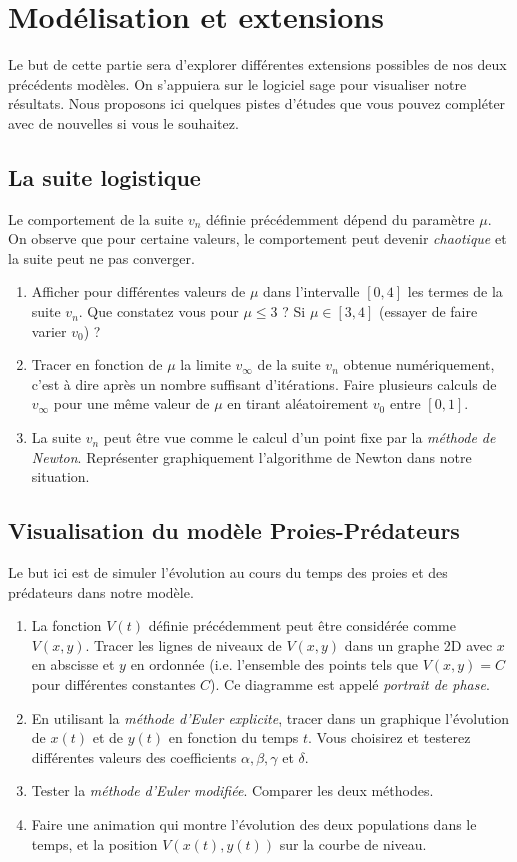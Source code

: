 \documentclass{../ficheTDTP}
\begin{document}
\section{Modélisation et extensions}

	Le but de cette partie sera d'explorer différentes extensions possibles de nos deux précédents modèles. On s'appuiera sur le logiciel sage pour visualiser notre résultats. Nous proposons ici quelques pistes d'études que vous pouvez compléter avec de nouvelles si vous le souhaitez.
	
\subsection{La suite logistique} Le comportement de la suite $v_n$ définie précédemment dépend du paramètre $\mu$. On observe que pour certaine valeurs, le comportement peut devenir \textit{chaotique} et la suite peut ne pas converger.
\begin{enumerate}
\item Afficher pour différentes valeurs de $\mu$ dans l'intervalle $[0,4]$ les termes de la suite $v_n$. Que constatez vous pour $\mu \leq 3$ ? Si $\mu \in [3,4]$ (essayer de faire varier $v_0$) ?
\item Tracer en fonction de $\mu$ la limite $v_{\infty}$ de la suite $v_n$ obtenue numériquement, c'est à dire après un nombre suffisant d'itérations. Faire plusieurs calculs de $v_{\infty}$ pour une même valeur de $\mu$ en tirant aléatoirement $v_0$ entre $[0,1]$.
\item La suite $v_n$ peut être vue comme le calcul d'un point fixe par la \textit{méthode de Newton}. Représenter graphiquement l'algorithme de Newton dans notre situation.
\end{enumerate}

\subsection{Visualisation du modèle Proies-Prédateurs} Le but ici est de simuler l'évolution au cours du temps des proies et des prédateurs dans notre modèle.
\begin{enumerate}
	\item La fonction $V(t)$ définie précédemment peut être considérée comme $V(x,y)$. Tracer les lignes de niveaux de $V(x,y)$ dans un graphe 2D avec $x$ en abscisse et $y$ en ordonnée (i.e. l'ensemble des points tels que $V(x,y) = C$ pour différentes constantes $C$). Ce diagramme est appelé \textit{portrait de phase}.
	\item En utilisant la \textit{méthode d'Euler explicite}, tracer dans un graphique l'évolution de $x(t)$ et de $y(t)$ en fonction du temps $t$.  Vous choisirez et testerez différentes valeurs des coefficients $\alpha,\beta,\gamma$ et $\delta$.
	\item Tester la \textit{méthode d'Euler modifiée}. Comparer les deux méthodes.
	\item Faire une animation qui montre l'évolution des deux populations dans le temps, et la position $V(x(t),y(t))$ sur la courbe de niveau.
\end{enumerate}
\end{document}
